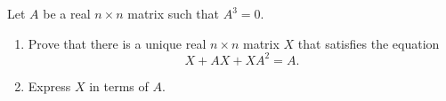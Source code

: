 \documentclass{article}
\begin{document}
\setlength{\parindent}{0pt}
Let \(\displaystyle A\) be a real \(\displaystyle n\times n\) matrix such that \(\displaystyle A^3=0\).
\begin{enumerate}[label=(\alph*)]
\item Prove that there is a unique real \(\displaystyle n\times n\) matrix \(\displaystyle X\) that satisfies the equation$$X+AX+XA^2=A.$$
\item Express \(\displaystyle X\) in terms of \(\displaystyle A\).
\end{enumerate} 
\end{document}
